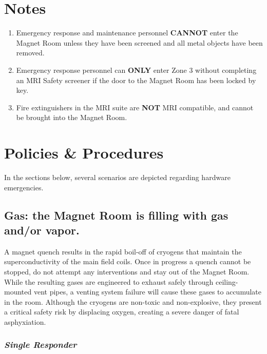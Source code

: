 \documentclass[11pt]{article}
\begin{document}
\section{Notes}

\begin{enumerate}
	\item Emergency response and maintenance personnel \textbf{CANNOT} enter the Magnet Room unless they have been screened and all metal objects have been removed.
	\item Emergency response personnel can \textbf{ONLY} enter Zone 3 without completing an MRI Safety screener if the door to the Magnet Room has been locked by key.
	\item Fire extinguishers in the MRI suite are \textbf{NOT} MRI compatible, and cannot be brought into the Magnet Room.
\end{enumerate}

\section{Policies \& Procedures}

In the sections below, several scenarios are depicted regarding hardware emergencies.


\subsection{Gas: the Magnet Room is filling with gas and/or vapor.}
\label{ssec:gas}

A magnet quench results in the rapid boil-off of cryogens that maintain the superconductivity of the main field coils. Once in progress a quench cannot be stopped, do not attempt any interventions and stay out of the Magnet Room. While the resulting gases are engineered to exhaust safely through ceiling-mounted vent pipes, a venting system failure will cause these gases to accumulate in the room. Although the cryogens are non-toxic and non-explosive, they present a critical safety risk by displacing oxygen, creating a severe danger of fatal asphyxiation.

\subsubsection*{\textit{Single Responder}}
\end{document}
